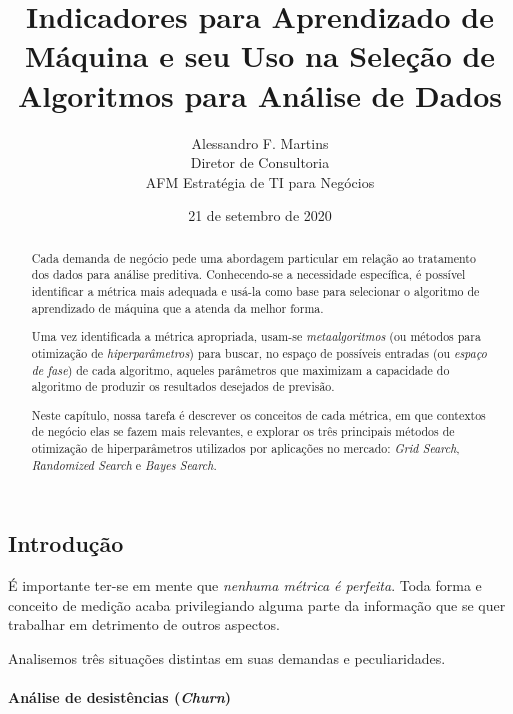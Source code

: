 \documentclass[]{article}
\date{}
\let\oldparagraph\paragraph
\renewcommand{\paragraph}[1]{\oldparagraph{#1}\mbox{}}
\begin{document}
\title{Indicadores para Aprendizado de Máquina e seu Uso na Seleção de Algoritmos para Análise de Dados}

\author{Alessandro F. Martins\\
Diretor de Consultoria\\
AFM Estratégia de TI para Negócios}

\date{21 de setembro de 2020}
\maketitle


\renewcommand{\abstractname}{Resumo}
\begin{abstract}

Cada demanda de negócio pede uma abordagem particular em relação ao
tratamento dos dados para análise preditiva. Conhecendo-se a necessidade
específica, é possível identificar a métrica mais adequada e usá-la como
base para selecionar o algoritmo de aprendizado de máquina que a atenda
da melhor forma.

Uma vez identificada a métrica apropriada, usam-se \emph{metaalgoritmos}
(ou métodos para otimização de \emph{hiperparâmetros}) para buscar, no
espaço de possíveis entradas (ou \emph{espaço de fase}) de cada
algoritmo, aqueles parâmetros que maximizam a capacidade do algoritmo de
produzir os resultados desejados de previsão.

Neste capítulo, nossa tarefa é descrever os conceitos de cada métrica,
em que contextos de negócio elas se fazem mais relevantes, e explorar os
três principais métodos de otimização de hiperparâmetros utilizados por
aplicações no mercado: \emph{Grid Search}, \emph{Randomized Search} e
\emph{Bayes Search}.

\end{abstract}

\hypertarget{header-n1070}{%
\subsection{Introdução}\label{header-n1070}}

É importante ter-se em mente que \emph{nenhuma métrica é perfeita}. Toda
forma e conceito de medição acaba privilegiando alguma parte da
informação que se quer trabalhar em detrimento de outros aspectos.

Analisemos três situações distintas em suas demandas e peculiaridades.

\hypertarget{header-n1074}{%
\paragraph{\texorpdfstring{Análise de desistências
(\emph{Churn})}{Análise de desistências (Churn)}}\label{header-n1074}}
\end{document}
